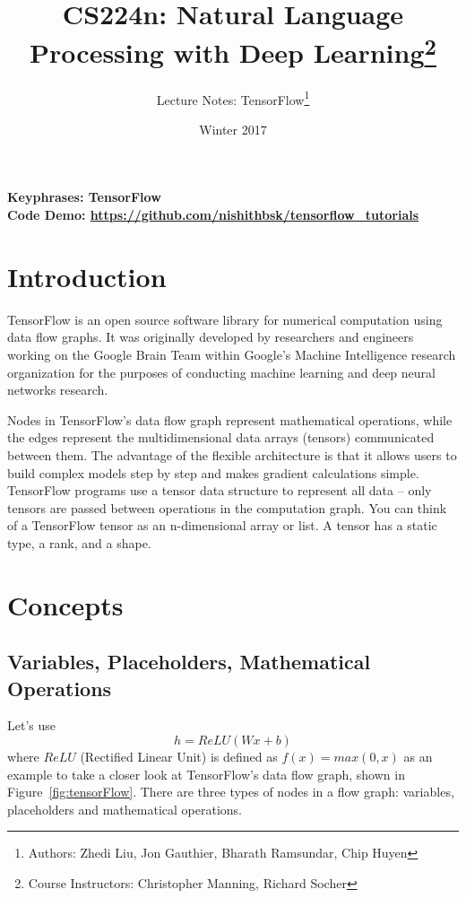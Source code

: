 \documentclass{tufte-handout}
\title{CS224n: Natural Language Processing with Deep Learning\thanks{Course Instructors: Christopher Manning, Richard Socher}}
\author[Zhedi Liu]{Lecture Notes:  TensorFlow\thanks{Authors: Zhedi Liu, Jon Gauthier, Bharath Ramsundar, Chip Huyen}}
\date{Winter 2017} %
\begin{document}
\maketitle%

\textbf{Keyphrases: TensorFlow} \\
\noindent
\textbf{Code Demo: \url{https://github.com/nishithbsk/tensorflow_tutorials}}

\section{Introduction}
TensorFlow is an open source software library for numerical computation using data flow graphs. It was originally developed by researchers and engineers working on the Google Brain Team within Google's Machine Intelligence research organization for the purposes of conducting machine learning and deep neural networks research. \\


Nodes in TensorFlow's data flow graph represent mathematical operations, while the edges represent the multidimensional data arrays (tensors) communicated between them. The advantage of the flexible architecture is that it allows users to build complex models step by step and makes gradient calculations simple. TensorFlow programs use a tensor data structure to represent all data -- only tensors are passed between operations in the computation graph. You can think of a TensorFlow tensor as an n-dimensional array or list. A tensor has a static type, a rank, and a shape.

\section{Concepts}
\subsection{Variables, Placeholders, Mathematical Operations}
Let's use $$h = ReLU(Wx + b)$$ where $ReLU$ (Rectified Linear Unit) is defined as $f(x) = max(0, x)$ as an example to take a closer look at TensorFlow's data flow graph, shown in Figure~\ref{fig:tensorFlow}. There are three types of nodes in a flow graph: variables, placeholders and mathematical operations. 
\end{document}
